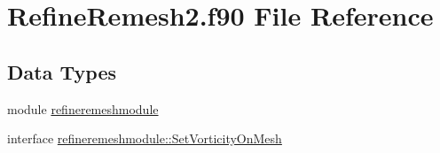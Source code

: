 \hypertarget{RefineRemesh2_8f90}{\section{Refine\+Remesh2.\+f90 File Reference}
\label{RefineRemesh2_8f90}
}
\subsection*{Data Types}
\begin{DoxyCompactItemize}
\item 
module \hyperlink{classrefineremeshmodule}{refineremeshmodule}
\item 
interface \hyperlink{interfacerefineremeshmodule_1_1SetVorticityOnMesh}{refineremeshmodule\+::\+Set\+Vorticity\+On\+Mesh}
\end{DoxyCompactItemize}
